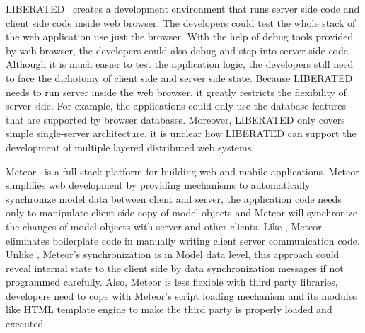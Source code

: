 LIBERATED~\cite{lipman2011liberated} creates a development environment that runs server side code and 
client side code inside web browser.
The developers could test the whole stack of the web application use just the browser.
With the help of \js{} debug tools provided by web browser, the developers could also
debug and step into server side code.
Although it is much easier to test the application logic,
the developers still need to face the dichotomy of client side and server side state.
Because LIBERATED needs to run server inside the web browser,
it greatly restricts the flexibility of server side.
For example, the applications could only use the database features that are supported by
browser databases.
Moreover, LIBERATED only covers simple single-server architecture, 
it is unclear how LIBERATED can support the development of multiple layered distributed web systems.

Meteor~\cite{meteor} is a full stack platform for building web and mobile applications.
Meteor simplifies web development by providing mechanisms to automatically synchronize model data 
between client and server,
the application code needs only to manipulate client side copy of model objects and
Meteor will synchronize the changes of model objects with server and other clients.
Like \cb{}, Meteor eliminates boilerplate code in manually writing client server communication code.
Unlike \cb{}, Meteor's synchronization is in Model data level, this approach
could reveal internal state to the client side by data synchronization messages if not programmed carefully.
Also, Meteor is less flexible with third party \js{} libraries, 
developers need to cope with 
Meteor's script loading mechanism and its modules like HTML template engine
 to make the third party \js{} is properly loaded and executed.
